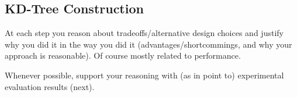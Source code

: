 \subsection{KD-Tree Construction}
\label{sec:kdtree}
At each step you reason about tradeoffs/alternative design choices and
justify why you did it in the way you did it (advantages/shortcommings,
and why your approach is reasonable). Of course mostly related to performance.

Whenever possible, support your reasoning with (as in point to) experimental
evaluation results (next).
